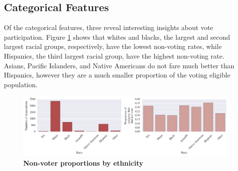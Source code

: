 \documentclass{article}
\begin{document}
	\subsection{Categorical Features}
	
	Of the categorical features, three reveal interesting insights about vote participation. Figure \ref{fig:categorical_race} shows that whites and blacks, the largest and second largest racial groups, respectively, have the lowest non-voting rates, while Hispanics, the third largest racial group, have the highest non-voting rate. Asians, Pacific Islanders, and Native Americans do not fare much better than Hispanics, however they are a much smaller proportion of the voting eligible population.	
	\begin{figure}[h!]
		\begin{center}
			\includegraphics*[width=1\linewidth]{categorical_race}
			\caption{\textbf{Non-voter proportions by ethnicity}}
			\label{fig:categorical_race}
		\end{center}
	\end{figure}
	\hfill \\
	
\end{document}
